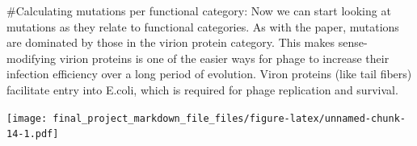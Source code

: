 \documentclass[
]{article}
\newenvironment{Shaded}{\begin{snugshade}}{\end{snugshade}}
\newcommand{\CommentTok}[1]{\textcolor[rgb]{0.56,0.35,0.01}{\textit{#1}}}
\newcommand{\DataTypeTok}[1]{\textcolor[rgb]{0.13,0.29,0.53}{#1}}
\newcommand{\DecValTok}[1]{\textcolor[rgb]{0.00,0.00,0.81}{#1}}
\newcommand{\KeywordTok}[1]{\textcolor[rgb]{0.13,0.29,0.53}{\textbf{#1}}}
\newcommand{\NormalTok}[1]{#1}
\newcommand{\OperatorTok}[1]{\textcolor[rgb]{0.81,0.36,0.00}{\textbf{#1}}}
\newcommand{\StringTok}[1]{\textcolor[rgb]{0.31,0.60,0.02}{#1}}
\begin{document}
\#Calculating mutations per functional category: Now we can start
looking at mutations as they relate to functional categories. As with
the paper, mutations are dominated by those in the virion protein
category. This makes sense- modifying virion proteins is one of the
easier ways for phage to increase their infection efficiency over a long
period of evolution. Viron proteins (like tail fibers) facilitate entry
into E.coli, which is required for phage replication and survival.

\begin{Shaded}
\end{Shaded}

\texttt{[image: final\_project\_markdown\_file\_files/figure-latex/unnamed-chunk-14-1.pdf]}
\end{document}
